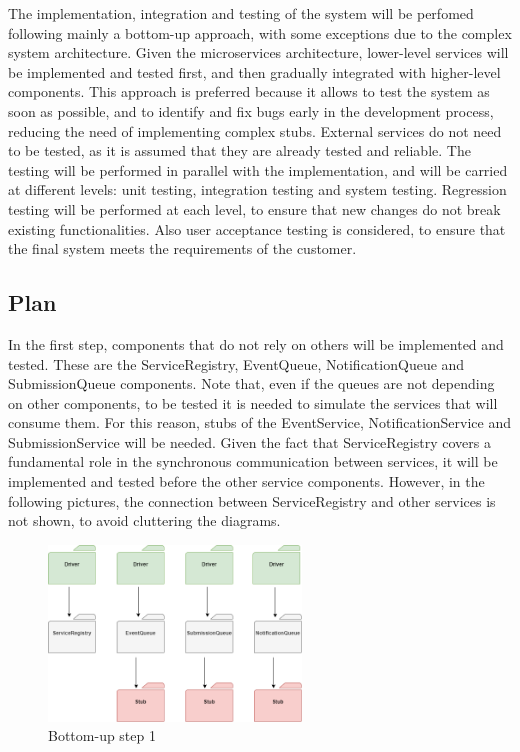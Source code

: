 The implementation, integration and testing of the system will be perfomed following mainly a bottom-up approach, with some exceptions due to the complex system architecture.
Given the microservices architecture, lower-level services will be implemented and tested first, and then gradually integrated with higher-level components.
This approach is preferred because it allows to test the system as soon as possible, and to identify and fix bugs early in the development process, reducing the need of implementing complex stubs.
External services do not need to be tested, as it is assumed that they are already tested and reliable.
The testing will be performed in parallel with the implementation, and will be carried at different levels: unit testing, integration testing and system testing.
Regression testing will be performed at each level, to ensure that new changes do not break existing functionalities.
Also user acceptance testing is considered, to ensure that the final system meets the requirements of the customer.

\subsection{Plan}
In the first step, components that do not rely on others will be implemented and tested. These are the ServiceRegistry, EventQueue, NotificationQueue and SubmissionQueue components.
Note that, even if the queues are not depending on other components, to be tested it is needed to simulate the services that will consume them. For this reason, stubs of the EventService, NotificationService and SubmissionService will be needed.
Given the fact that ServiceRegistry covers a fundamental role in the synchronous communication between services, it will be implemented and tested before the other service components. 
However, in the following pictures, the connection between ServiceRegistry and other services is not shown, to avoid cluttering the diagrams.
\begin{figure}[H]
    \centering
    \includegraphics[width=0.6\textwidth]{Diagrams/integration_1.png}
    \caption{Bottom-up step 1}
\end{figure}


